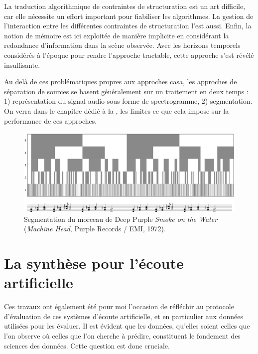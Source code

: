   La traduction algorithmique de contraintes de structuration est un art difficile, car elle nécessite un effort important pour fiabiliser les algorithmes. La gestion de l'interaction entre les différentes contraintes de structuration l'est aussi. Enfin, la notion de mémoire est ici exploitée de manière implicite en considérant la redondance d'information dans la scène observée. Avec les horizons temporels considérés à l'époque pour rendre l'approche tractable, cette approche s'est révélé insuffisante.



  Au delà de ces problématiques propres aux approches casa, les approches de séparation de sources se basent généralement sur un traitement en deux temps : 1) représentation du signal audio sous forme de spectrogramme, 2) segmentation. On verra dans le chapitre dédié à la , les limites ce que cela impose sur la performance de ces approches.

  \begin{figure}[t]
    \includegraphics[width=\textwidth]{figures/smokeCrop}
    \caption{Segmentation du morceau de Deep Purple \emph{Smoke on the Water} (\emph{Machine Head}, Purple Records / EMI, 1972).}  \label{fig:smoke}
  \end{figure}

  \section{ \nmu La  synthèse pour l'écoute artificielle} \label{sec:dcase}

  Ces travaux ont également été pour moi l'occasion de réfléchir au protocole d'évaluation de ces systèmes d'écoute artificielle, et en particulier aux données utilisées pour les évaluer. Il est évident que les données, qu'elles soient celles que l'on observe où celles que l'on cherche à prédire, constituent le fondement des sciences des données. Cette question est donc cruciale.

